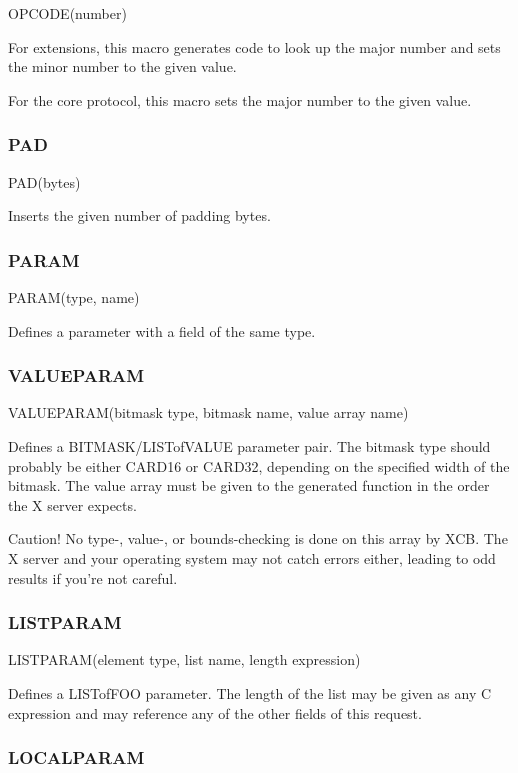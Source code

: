 \documentclass{article}
\begin{document}
OPCODE(number)

For extensions, this macro generates code to look up the major number
and sets the minor number to the given value.

For the core protocol, this macro sets the major number to the given
value.


\subsubsection{PAD}

PAD(bytes)

Inserts the given number of padding bytes.


\subsubsection{PARAM}

PARAM(type, name)

Defines a parameter with a field of the same type.


\subsubsection{VALUEPARAM}

VALUEPARAM(bitmask type, bitmask name, value array name)

Defines a BITMASK/LISTofVALUE parameter pair. The bitmask type should
probably be either CARD16 or CARD32, depending on the specified width
of the bitmask. The value array must be given to the generated function
in the order the X server expects.

Caution! No type-, value-, or bounds-checking is done on this array by
XCB. The X server and your operating system may not catch errors either,
leading to odd results if you're not careful.


\subsubsection{LISTPARAM}

LISTPARAM(element type, list name, length expression)

Defines a LISTofFOO parameter. The length of the list may be given
as any C expression and may reference any of the other fields of this
request.


\subsubsection{LOCALPARAM}
\end{document}

